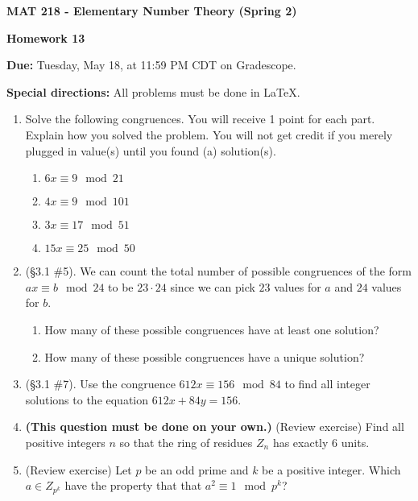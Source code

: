 \documentclass[11pt,a4paper]{article}
\begin{document}
\begin{Large}
\centerline{\bf MAT 218 - Elementary Number Theory (Spring 2)}\medskip
\centerline{\bf Homework 13}\medskip
\end{Large}
{\bf Due:} Tuesday, May 18, at 11:59 PM CDT on Gradescope. 

{\bf Special directions:}  All problems must be done in \LaTeX. 


\hrulefill

\begin{enumerate}
	
	
	
	\item Solve the following congruences. You will receive 1 point for each part. Explain how you solved the problem. You will not get credit if you merely plugged in value(s) until you found (a) solution(s).
		\begin{enumerate}
			\item \(6x \equiv 9 \mod 21\)
			\item \(4x \equiv 9 \mod 101\)
			\item \(3x \equiv 17 \mod 51\)
			\item \(15x \equiv 25 \mod 50\)
		\end{enumerate}
	
	
	\item (\S 3.1 \#5). We can count the total number of possible congruences of the form \(ax \equiv b \mod 24\) to be \(23 \cdot 24\) since we can pick \(23\) values for \(a\) and \(24\) values for \(b\). 
		\begin{enumerate}
			\item How many of these possible congruences have at least one solution?
			\item How many of these possible congruences have a unique solution?
		\end{enumerate} 
	
	\item (\S 3.1 \#7). Use the congruence \(612x \equiv 156 \mod 84\) to  find all integer solutions to the equation \(612x+ 84y= 156\).
	
	\item \textbf{(This question must be done on your own.)} (Review exercise) Find all positive integers \(n\) so that the ring of residues \(Z_{n}\) has exactly \(6\) units.
	
	\item (Review exercise) Let \(p\) be an odd prime and \(k\) be a positive integer.  Which \(a \in Z_{p^{k}}\) have the property that that \(a^{2} \equiv 1 \mod p^{k}\)?
	
\end{enumerate}
\end{document}
